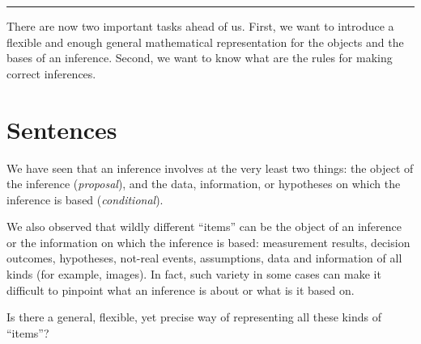 \documentclass[
  a4paper,
  DIV=11,
  numbers=noendperiod,
  oneside]{scrreprt}
\begin{document}
\hfill\break

\begin{center}\rule{0.5\linewidth}{0.5pt}\end{center}

There are now two important tasks ahead of us. First, we want to
introduce a flexible and enough general mathematical representation for
the objects and the bases of an inference. Second, we want to know what
are the rules for making correct inferences.

\hypertarget{sentences}{%
\chapter{Sentences}\label{sentences}}

\providecommand{\ul}{\uline}
\renewcommand*{\|}[1][]{\nonscript\:#1\vert\nonscript\:\mathopen{}}
\providecommand*{\pr}[1]{\textsf{\small`#1'}}
\renewcommand*{\pr}[1]{\textsf{\small`#1'}}
\providecommand*{\prq}[1]{\textsf{\small #1}}
\renewcommand*{\prq}[1]{\textsf{\small #1}}
\providecommand{\se}[1]{\mathsfit{#1}}
\renewcommand{\se}[1]{\mathsfit{#1}}
\providecommand{\p}{\mathrm{p}}
\renewcommand{\p}{\mathrm{p}}
\renewcommand{\P}{\mathrm{P}}

We have seen that an inference involves at the very least two things:
the object of the inference (\emph{proposal}), and the data,
information, or hypotheses on which the inference is based
(\emph{conditional}).

We also observed that wildly different ``items'' can be the object of an
inference or the information on which the inference is based:
measurement results, decision outcomes, hypotheses, not-real events,
assumptions, data and information of all kinds (for example, images). In
fact, such variety in some cases can make it difficult to pinpoint what
an inference is about or what is it based on.

Is there a general, flexible, yet precise way of representing all these
kinds of ``items''?
\end{document}
